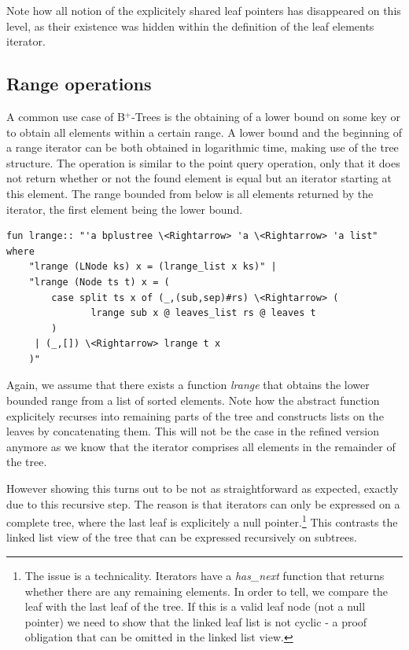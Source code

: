 \documentclass[a4paper,UKenglish,cleveref, autoref, thm-restate]{lipics-v2021}
\newcommand{\btrees}{B$^+$-Trees}
\begin{document}
Note how all notion of the explicitely shared leaf pointers
has disappeared on this level, as their existence was hidden within the definition
of the leaf elements iterator.

\subsection{Range operations}
\label{sec:imperative_range}

A common use case of \btrees %
is the obtaining of a lower bound on some key
or to obtain  all elements within a certain range.
A lower bound and the beginning of a range iterator
can be both obtained in logarithmic time, making use of the tree structure.
The operation is similar to the point query operation,
only that it does not return whether or not the
found element is equal but an iterator starting at this element.
The range bounded from below is all elements returned by the iterator,
the first element being the lower bound.

\begin{lstlisting}[mathescape=true, language=Isabelle,label=lst:btree-lrange]
fun lrange:: "'a bplustree \<Rightarrow> 'a \<Rightarrow> 'a list" where
    "lrange (LNode ks) x = (lrange_list x ks)" |
    "lrange (Node ts t) x = (
        case split ts x of (_,(sub,sep)#rs) \<Rightarrow> (
               lrange sub x @ leaves_list rs @ leaves t
        )
     | (_,[]) \<Rightarrow> lrange t x
    )"
\end{lstlisting}
  
Again, we assume that there exists a function \textit{lrange} that
obtains the lower bounded range from a list of sorted elements.
Note how the abstract function explicitely recurses into
remaining parts of the tree and constructs lists on the leaves by concatenating them.
This will not be the case in the refined version anymore
as we know that the iterator comprises all elements in the remainder of the tree.

However showing this turns out to be not as straightforward
as expected, exactly due to this recursive step.
The reason is that iterators can only be expressed on a complete tree,
where the last leaf is explicitely a null pointer.\footnote{
    The issue is a technicality. Iterators have a \textit{has\_next} function
    that returns whether there are any remaining elements.
    In order to tell, we compare the leaf with the last leaf of the tree.
    If this is a valid leaf node (not a null pointer) we need to show
    that the linked leaf list is not cyclic - a proof obligation
    that can be omitted in the linked list view.
}
This contrasts the linked list view of the tree that can be expressed
recursively on subtrees.
\end{document}
